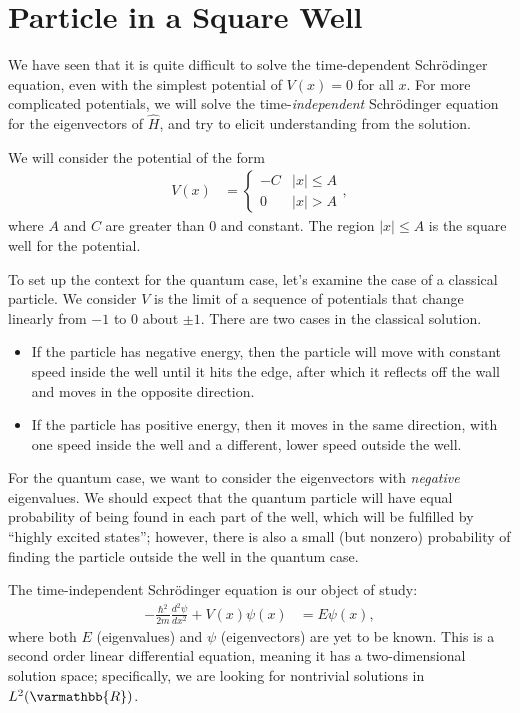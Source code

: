 \documentclass[12pt]{extarticle}
\newcommand{\R}{\varmathbb{R}}
\theoremstyle{plain}
\theoremstyle{definition}
\theoremstyle{remark}
\renewcommand{\newline}{\hfill\break}
\begin{document}
  \section{Particle in a Square Well}%
  We have seen that it is quite difficult to solve the time-dependent Schrödinger equation, even with the simplest potential of $V(x) = 0$ for all $x$. For more complicated potentials, we will solve the time-\textit{independent} Schrödinger equation for the eigenvectors of $\hat{H}$, and try to elicit understanding from the solution.\newline

  We will consider the potential of the form
  \begin{align*}
    V(x) &= \begin{cases}
      -C & |x| \leq A\\
      0 & |x| > A
    \end{cases},
  \end{align*}
  where $A$ and $C$ are greater than $0$ and constant. The region $|x| \leq A$ is the square well for the potential.\newline

  To set up the context for the quantum case, let's examine the case of a classical particle. We consider $V$ is the limit of a sequence of potentials that change linearly from $-1$ to $0$ about $\pm 1$. There are two cases in the classical solution.
  \begin{itemize}
    \item If the particle has negative energy, then the particle will move with constant speed inside the well until it hits the edge, after which it reflects off the wall and moves in the opposite direction.
    \item If the particle has positive energy, then it moves in the same direction, with one speed inside the well and a different, lower speed outside the well.
  \end{itemize}
  For the quantum case, we want to consider the eigenvectors with \textit{negative} eigenvalues. We should expect that the quantum particle will have equal probability of being found in each part of the well, which will be fulfilled by ``highly excited states''; however, there is also a small (but nonzero) probability of finding the particle outside the well in the quantum case.\newline

  The time-independent Schrödinger equation is our object of study:
  \begin{align*}
    -\frac{\hbar^2}{2m}\frac{d ^2\psi}{d x^2} + V(x)\psi(x) &= E\psi(x),
  \end{align*}
  where both $E$ (eigenvalues) and $\psi$ (eigenvectors) are yet to be known. This is a second order linear differential equation, meaning it has a two-dimensional solution space; specifically, we are looking for nontrivial solutions in $L^{2}(\R)$.
\end{document}
